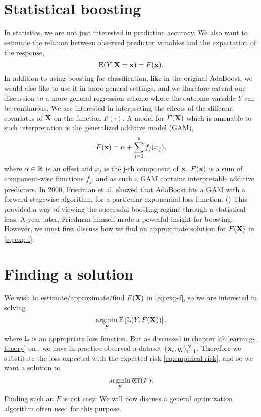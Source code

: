 \section{Statistical boosting}\label{sec:sboost}
In statistics, we are not just interested in prediction accuracy. We also want to estimate the relation between observed predictor variables and the expectation of the response,
\begin{equation}\label{eq:exp-f}
    \operatorname{E}(Y|\mathbf{X}=\mathbf{x})=F(\mathbf{x}).
\end{equation}
In addition to using boosting for classification, like in the original AdaBoost, we would also like to use it in more general settings, and we therefore extend our discussion to a more general regression scheme where the outcome variable $Y$ can be continuous. We are interested in interpreting the effects of the different covariates of $\mathbf{X}$ on the function $F(\cdot)$. A model for $F(\mathbf{X})$ which is amenable to such interpretation is the generalized additive model (GAM),
\begin{equation}\label{eq:gam}
    F(\mathbf{x})=\alpha+\sum_{j=1}^pf_j(x_j),
\end{equation}
where $\alpha\in\mathbb{R}$ is an offset and $x_j$ is the j-th component of $\mathbf{x}$. $F(\mathbf{x})$ is a sum of component-wise functions $f_j$, and as such a GAM contains interpretable additive predictors. In 2000, Friedman et al. showed that AdaBoost fits a GAM with a forward stagewise algorithm, for a particular exponential loss function. (\cite{friedman2000}) This provided a way of viewing the successful boosting regime through a statistical lens. A year later, Friedman himself made a powerful insight for boosting. However, we must first discuss how we find an approximate solution for $F(\mathbf{X})$ in \eqref{eq:exp-f}.

\section{Finding a solution}
We wish to estimate/approximate/find $F(\mathbf{X})$ in \eqref{eq:exp-f}, so we are interested in solving
\begin{equation}
    \operatorname*{argmin}_{F}\operatorname{E}\left[\operatorname{L}(Y,F(\mathbf{X}))\right],
\end{equation}
where $\operatorname{L}$ is an appropriate loss function. But as discussed in chapter \ref{ch:learning-theory} on , we have in practice observed a dataset $\{\mathbf{x}_i,y_i\}_{i=1}^N$. Therefore we substitute the loss expected with the expected risk \eqref{eq:empirical-risk}, and so we want a solution to
\begin{equation}\label{eq:argmin-risk}
    \operatorname*{argmin}_{F}\overline{\text{err}}(F).
\end{equation}
Finding such an $F$ is not easy. We will now discuss a general optimization algorithm often used for this purpose.

